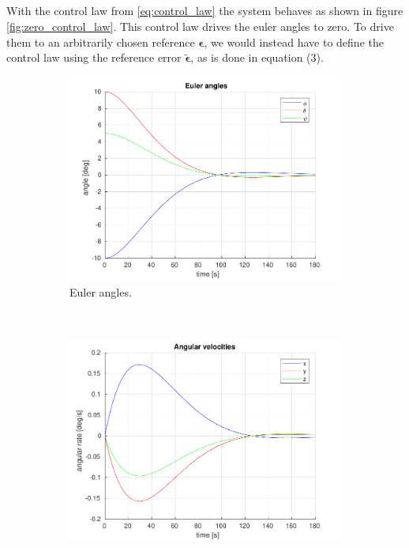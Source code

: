 \subsection{}
With the control law from \eqref{eq:control_law} the system behaves as shown in figure \ref{fig:zero_control_law}. This control law drives the euler angles to zero. To drive them to an arbitrarily chosen reference $\boldsymbol{\epsilon}$, we would instead have to define the control law using the reference error $\tilde{\boldsymbol{\epsilon}}$, as is done in equation (3).
\begin{figure}[ht]
	\centering
	\begin{subfigure}[b]{0.45\textwidth}
		\includegraphics[width=\textwidth]{1_3_euler_angles}
		\caption{Euler angles.}
		\label{fig:2a}
	\end{subfigure}
	~ %
	\begin{subfigure}[b]{0.45\textwidth}
		\includegraphics[width=\textwidth]{1_3_angular_velocities}

\end{subfigure}
\end{figure}
